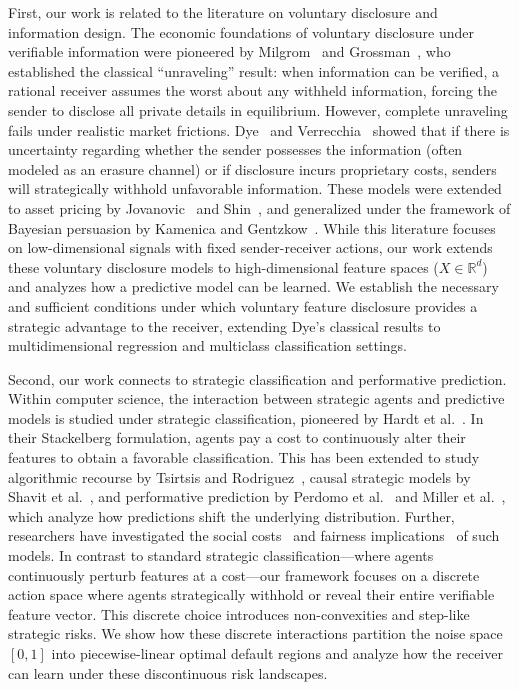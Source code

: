 First, our work is related to the literature on voluntary disclosure and information design. The economic foundations of voluntary disclosure under verifiable information were pioneered by Milgrom~\cite{milgrom1981good} and Grossman~\cite{grossman1981informational}, who established the classical ``unraveling'' result: when information can be verified, a rational receiver assumes the worst about any withheld information, forcing the sender to disclose all private details in equilibrium. However, complete unraveling fails under realistic market frictions. Dye~\cite{dye1985disclosure} and Verrecchia~\cite{verrecchia1983discretionary} showed that if there is uncertainty regarding whether the sender possesses the information (often modeled as an erasure channel) or if disclosure incurs proprietary costs, senders will strategically withhold unfavorable information. These models were extended to asset pricing by Jovanovic~\cite{jovanovic1982truthful} and Shin~\cite{shin2003disclosures}, and generalized under the framework of Bayesian persuasion by Kamenica and Gentzkow~\cite{kamenica2011bayesian}. While this literature focuses on low-dimensional signals with fixed sender-receiver actions, our work extends these voluntary disclosure models to high-dimensional feature spaces ($X \in \mathbb{R}^d$) and analyzes how a predictive model can be learned. We establish the necessary and sufficient conditions under which voluntary feature disclosure provides a strategic advantage to the receiver, extending Dye’s classical results to multidimensional regression and multiclass classification settings.

Second, our work connects to strategic classification and performative prediction. Within computer science, the interaction between strategic agents and predictive models is studied under strategic classification, pioneered by Hardt et al.~\cite{hardt2016strategic}. In their Stackelberg formulation, agents pay a cost to continuously alter their features to obtain a favorable classification. This has been extended to study algorithmic recourse by Tsirtsis and Rodriguez~\cite{tsirtsis2020decisions}, causal strategic models by Shavit et al.~\cite{shavit2020causal}, and performative prediction by Perdomo et al.~\cite{perdomo2020performative} and Miller et al.~\cite{miller2020strategic}, which analyze how predictions shift the underlying distribution. Further, researchers have investigated the social costs~\cite{milli2019social} and fairness implications~\cite{hu2019disparate} of such models. In contrast to standard strategic classification—where agents continuously perturb features at a cost—our framework focuses on a discrete action space where agents strategically withhold or reveal their entire verifiable feature vector. This discrete choice introduces non-convexities and step-like strategic risks. We show how these discrete interactions partition the noise space $[0,1]$ into piecewise-linear optimal default regions and analyze how the receiver can learn under these discontinuous risk landscapes.

